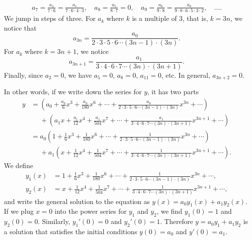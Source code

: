 \begin{example}
\begin{multline*}
a_7 = \frac{a_4}{7 \cdot 6} = \frac{a_1}{7 \cdot 6 \cdot 4 \cdot 3}, \quad
a_8 = \frac{a_5}{8 \cdot 7} = 0, \quad
a_9 = \frac{a_6}{9 \cdot 8} = \frac{a_0}{9 \cdot 8 \cdot 6 \cdot 5 \cdot 3
\cdot 2}, \quad
\ldots .
\end{multline*}
We jump in steps of three.
For $a_k$ where $k$ is a multiple of $3$, that is, $k=3n$, we notice
that
\begin{equation*}
a_{3n} = \frac{a_0}{2 \cdot 3 \cdot 5 \cdot 6 \cdots (3n-1) \cdot (3n)} .
\end{equation*}
For $a_k$ where $k = 3n+1$, we notice
\begin{equation*}
a_{3n+1} = \frac{a_1}{3 \cdot 4 \cdot 6 \cdot 7 \cdots (3n) \cdot (3n+1)} .
\end{equation*}
Finally, since $a_2 = 0$, we have $a_5 = 0$, $a_8 = 0$, $a_{11}=0$, etc.
In general, $a_{3n+2} = 0$.

In other words, if we write down the series for $y$,
it has two parts
\begin{equation*}
\begin{split}
y &=
\left(
a_0 + \frac{a_0}{6} x^3 + \frac{a_0}{180} x^6 + \cdots +
\frac{a_0}{2 \cdot 3 \cdot 5 \cdot 6 \cdots (3n-1) \cdot (3n)} x^{3n} + \cdots
\right)
\\
&\phantom{=}
+
\left(
a_1 x + \frac{a_1}{12} x^4 + \frac{a_1}{504} x^7 + \cdots +
\frac{a_1}{3 \cdot 4 \cdot 6 \cdot 7 \cdots (3n) \cdot (3n+1)} x^{3n+1} + \cdots
\right)
\\
& =
a_0
\left(
1 + \frac{1}{6} x^3 + \frac{1}{180} x^6 + \cdots +
\frac{1}{2 \cdot 3 \cdot 5 \cdot 6 \cdots (3n-1) \cdot (3n)} x^{3n} + \cdots
\right)
\\
&\phantom{=}
+
a_1
\left(
x + \frac{1}{12} x^4 + \frac{1}{504} x^7 + \cdots +
\frac{1}{3 \cdot 4 \cdot 6 \cdot 7 \cdots (3n) \cdot (3n+1)} x^{3n+1} + \cdots
\right) .
\end{split}
\end{equation*}
We define
\begin{align*}
y_1(x) &= 
1 + \frac{1}{6} x^3 + \frac{1}{180} x^6 + \cdots +
\frac{1}{2 \cdot 3 \cdot 5 \cdot 6 \cdots (3n-1) \cdot (3n)} x^{3n} + \cdots, \\
y_2(x) &= 
x + \frac{1}{12} x^4 + \frac{1}{504} x^7 + \cdots +
\frac{1}{3 \cdot 4 \cdot 6 \cdot 7 \cdots (3n) \cdot (3n+1)} x^{3n+1} + \cdots ,
\end{align*}
and write the general solution to the equation as
$y(x)= a_0 y_1(x) + a_1 y_2(x)$.  If we plug $x=0$ into the
power series for $y_1$ and $y_2$, we find
$y_1(0) = 1$ and $y_2(0) = 0$.  Similarly,
$y_1'(0) = 0$ and $y_2'(0) = 1$.  Therefore $y = a_0 y_1 + a_1 y_2$
is a solution
that satisfies the initial conditions $y(0) = a_0$ and $y'(0) = a_1$.


\end{example}
